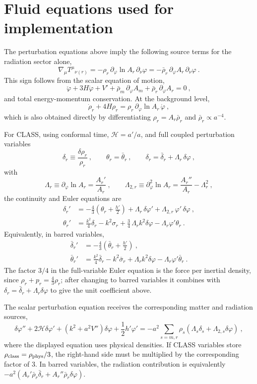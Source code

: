\documentclass[11pt,a4paper,english,twoside]{article}
\def\beq{\begin{equation}}
\def\eeq{\end{equation}}
\def\del {\partial}
\begin{document}
\section{Fluid equations used for implementation}

The perturbation equations above imply the following source terms for the radiation sector
alone,
\beq
\nabla_{\mu} T^{\mu}{}_{\nu(r)}
=- \rho_r\,\del_\varphi \ln A_r\,\del_\nu\varphi
=-\bar\rho_r\,\del_\varphi A_r\,\del_\nu\varphi \ .
\eeq
This sign follows from the scalar equation of motion,
\beq
\ddot\varphi+3H\dot\varphi+V' +\bar\rho_m\,\del_\varphi A_m
+\bar\rho_r\,\del_\varphi A_r=0 \ ,
\eeq
and total energy-momentum conservation. At the background level,
\beq
\dot\rho_r+4H\rho_r=\rho_r\,\del_\varphi\ln A_r\,\dot\varphi \ ,
\eeq
which is also obtained directly by differentiating $\rho_r=A_r\bar\rho_r$ and
$\bar\rho_r\propto a^{-4}$.

For CLASS, using conformal time, $\mathcal{H}=a'/a$, and full coupled perturbation
variables
\beq
\delta_r\equiv\frac{\delta\rho_r}{\rho_r}\ ,\qquad
\theta_r=\bar\theta_r\ ,\qquad
\delta_r=\bar\delta_r+\Lambda_r\,\delta\varphi\ ,
\eeq
with
\beq
\Lambda_r\equiv \del_\varphi\ln A_r=\frac{A_r'}{A_r}\ ,\qquad
\Lambda_{2,r}\equiv \del_\varphi^2\ln A_r=\frac{A_r''}{A_r}-\Lambda_r^2\ ,
\eeq
the continuity and Euler equations are
\begin{align}
\delta_r' &=
-\frac43\left(\theta_r+\frac{h'}{2}\right)
+\Lambda_r\,\delta\varphi'
+\Lambda_{2,r}\,\varphi'\,\delta\varphi \ ,
\\
\theta_r' &=
\frac{k^2}{4}\delta_r-k^2\sigma_r
+\frac34\,\Lambda_r k^2\delta\varphi
-\Lambda_r\varphi'\theta_r \ .
\end{align}
Equivalently, in barred variables,
\begin{align}
\bar\delta_r' &=-\frac43\left(\bar\theta_r+\frac{h'}{2}\right) \ ,
\\
\bar\theta_r' &=\frac{k^2}{4}\bar\delta_r-k^2\bar\sigma_r
+\Lambda_r k^2\delta\varphi-\Lambda_r\varphi'\bar\theta_r \ .
\end{align}
The factor $3/4$ in the full-variable Euler equation is the force per inertial density,
since $\rho_r+p_r=\frac43\rho_r$; after changing to barred variables it combines with
$\delta_r=\bar\delta_r+\Lambda_r\delta\varphi$ to give the unit coefficient above.

The scalar perturbation equation receives the corresponding matter and radiation sources,
\beq
\delta\varphi''+2\mathcal{H}\delta\varphi'
+\left(k^2+a^2V''\right)\delta\varphi
+\frac12 h'\varphi'
=-a^2\sum_{s=m,r}\rho_s
\left(\Lambda_s\delta_s+\Lambda_{2,s}\delta\varphi\right) \ ,
\eeq
where the displayed equation uses physical densities. If CLASS variables store
$\rho_{\rm class}=\rho_{\rm phys}/3$, the right-hand side must be multiplied by the
corresponding factor of $3$. In barred variables, the radiation contribution is equivalently
$-a^2\left(A_r'\bar\rho_r\bar\delta_r+A_r''\bar\rho_r\delta\varphi\right)$.
\end{document}
